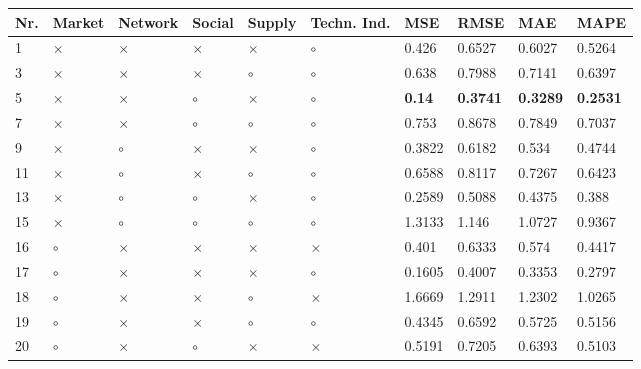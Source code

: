 \begin{table}[H]
\centering
\begin{tabular}{|P{0.7cm}|P{1.3cm}P{1.3cm}P{1.3cm}P{1.3cm}P{1.3cm}|P{1.1cm}P{1.1cm}P{1.1cm}P{1.1cm}|}
\hline
 Nr. &   Market &  Network &   Social &   Supply & Techn. Ind. &           MSE &            RMSE &             MAE &            MAPE \\
 & $\times$ & $\times$ & $\times$ & $\times$ &     $\circ$ &         0.426 &          0.6527 &          0.6027 &          0.5264 \\
   3 & $\times$ & $\times$ & $\times$ &  $\circ$ &     $\circ$ &         0.638 &          0.7988 &          0.7141 &          0.6397 \\
   5 & $\times$ & $\times$ &  $\circ$ & $\times$ &     $\circ$ & \textbf{0.14} & \textbf{0.3741} & \textbf{0.3289} & \textbf{0.2531} \\
   7 & $\times$ & $\times$ &  $\circ$ &  $\circ$ &     $\circ$ &         0.753 &          0.8678 &          0.7849 &          0.7037 \\
   9 & $\times$ &  $\circ$ & $\times$ & $\times$ &     $\circ$ &        0.3822 &          0.6182 &           0.534 &          0.4744 \\
  11 & $\times$ &  $\circ$ & $\times$ &  $\circ$ &     $\circ$ &        0.6588 &          0.8117 &          0.7267 &          0.6423 \\
  13 & $\times$ &  $\circ$ &  $\circ$ & $\times$ &     $\circ$ &        0.2589 &          0.5088 &          0.4375 &           0.388 \\
  15 & $\times$ &  $\circ$ &  $\circ$ &  $\circ$ &     $\circ$ &        1.3133 &           1.146 &          1.0727 &          0.9367 \\
  16 &  $\circ$ & $\times$ & $\times$ & $\times$ &    $\times$ &         0.401 &          0.6333 &           0.574 &          0.4417 \\
  17 &  $\circ$ & $\times$ & $\times$ & $\times$ &     $\circ$ &        0.1605 &          0.4007 &          0.3353 &          0.2797 \\
  18 &  $\circ$ & $\times$ & $\times$ &  $\circ$ &    $\times$ &        1.6669 &          1.2911 &          1.2302 &          1.0265 \\
  19 &  $\circ$ & $\times$ & $\times$ &  $\circ$ &     $\circ$ &        0.4345 &          0.6592 &          0.5725 &          0.5156 \\
  20 &  $\circ$ & $\times$ &  $\circ$ & $\times$ &    $\times$ &        0.5191 &          0.7205 &          0.6393 &          0.5103 \\

\end{tabular}
\end{table}
